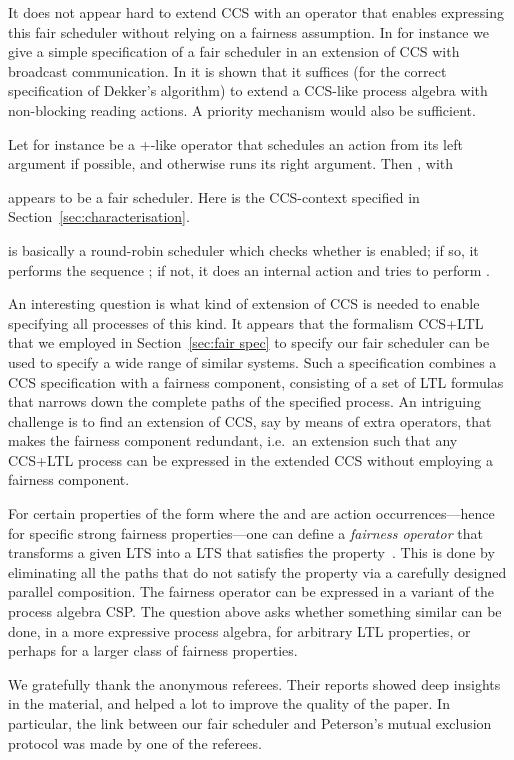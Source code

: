 \documentclass[smallcondensed]{svjour3}
\newcommand{\Sect}[1]{Section~\ref{sec:#1}}
\newcounter {part}
\begin{document}
It does not appear hard to extend CCS with an operator that enables expressing this fair
scheduler without relying on a fairness assumption.
In \cite{GH14} for instance we give a simple specification of a fair scheduler in an extension of
CCS with broadcast communication. In \cite{CDV09} it is shown that it suffices (for the correct specification
of Dekker's algorithm) to extend a CCS-like process algebra with non-blocking reading actions.
A priority mechanism \cite{CLN01} would also be sufficient.

Let  for instance be a +-like operator that schedules an action from its left argument if
possible, and otherwise runs its right argument. Then , with

appears to be a fair scheduler. Here
 is the CCS-context specified in \Sect{characterisation}.

 is basically a round-robin scheduler which checks whether  is enabled; if so, it performs
the sequence ; if not, it does an internal action and tries to perform .

An interesting question is what kind of extension of CCS is needed to enable specifying all
processes of this kind. It appears that the formalism CCS+LTL that we employed in \Sect{fair spec} to
specify our fair scheduler can be used to specify a wide range of similar systems.
Such a specification combines a CCS specification with a fairness component, consisting
of a set of LTL formulas that narrows down the complete paths of the specified process.
An intriguing challenge is to find an extension of CCS, say by means of extra operators,
that makes the fairness component redundant, i.e.\ an extension such that any CCS+LTL process can be expressed in
the extended CCS without employing a fairness component.


For certain properties of the form 
where the  and  are action occurrences---hence for specific strong fairness properties---one can
define a \emph{fairness operator} that
transforms a given LTS into a LTS that satisfies the property~\cite{PuhakkaValmari01}.
This is done by eliminating all the paths that do not satisfy the property via a carefully designed parallel composition. 
The fairness operator can be expressed in a variant of the process algebra CSP\@.
The question above asks whether something similar can be done, in a more expressive process algebra,
for arbitrary LTL properties, or perhaps for a larger class of fairness properties.

 \begin{acknowledgements}
We gratefully thank the anonymous referees. Their reports showed deep insights in the
material, and helped a lot to improve the quality of the paper. In particular, the link between our fair
scheduler and Peterson's mutual exclusion protocol was made by one of the referees.
 \end{acknowledgements}
\end{document}
